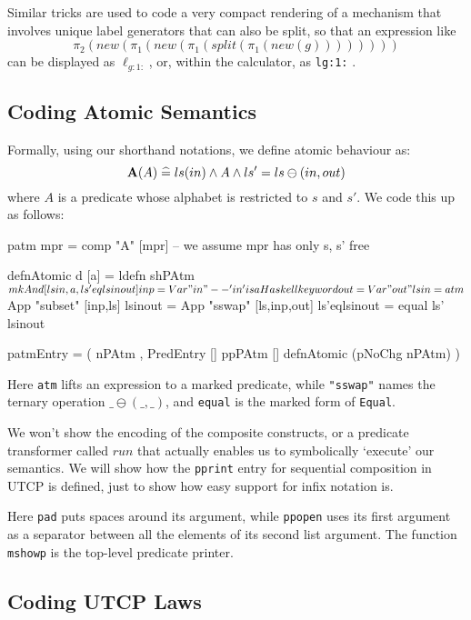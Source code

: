 Similar tricks are used to code a very compact rendering
of a mechanism that involves unique label generators
that can also be split, so that an expression like
\[
 \pi_2(new(\pi_1(new(\pi_1(split(\pi_1(new(g))))))))
\]
can be displayed as $\ell_{g:1:}$, or,
within the calculator, as \texttt{lg:1:} .


\subsection{Coding Atomic Semantics}

Formally, using our shorthand notations, we define atomic behaviour as:
\[
    \mathbf{A}(A) \mathrel{\widehat=} ls(in) \land A \land ls'=ls\ominus(in,out)
\]
where $A$ is a predicate whose alphabet is restricted to $s$ and $s'$.
We code this up as follows:
\begin{code}
patm mpr = comp "A" [mpr] -- we assume mpr has only s, s' free

defnAtomic d [a] = ldefn shPAtm $ mkAnd [lsin,a,ls'eqlsinout]

inp = Var "in" -- 'in' is a Haskell keyword
out = Var "out"
lsin = atm $ App "subset" [inp,ls]
lsinout = App "sswap" [ls,inp,out]
ls'eqlsinout = equal ls' lsinout

patmEntry
 = ( nPAtm
   , PredEntry [] ppPAtm [] defnAtomic (pNoChg nPAtm) )
\end{code}
Here \texttt{atm} lifts an expression to a marked predicate,
while \texttt{"sswap"} names the ternary operation $\_\ominus(\_,\_)$,
and \texttt{equal} is the marked form of \texttt{Equal}.


We won't show the encoding of the composite constructs,
or a predicate transformer called $run$ that actually
enables us to symbolically `execute' our semantics.
We will show how the \texttt{pprint} entry for
sequential composition in UTCP is defined,
just to show how easy support for infix notation is.
Here \texttt{pad} puts spaces around its argument,
while \texttt{ppopen} uses its first argument as a
separator between all the elements of its second list argument.
The function \texttt{mshowp} is the top-level predicate printer.


\subsection{Coding UTCP Laws}

